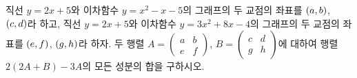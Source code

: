 직선 $y=2x+5$와 이차함수 $y=x^2-x-5$의 그래프의 두 교점의 좌표를 $(a{,}\mkern3mu\mathopen{}b)$, $(c{,}\mkern3mu\mathopen{}d)$라 하고, 직선 $y=2x+5$와 이차함수 $y=3x^2+8x-4$의 그래프의 두 교점의 좌표를 $(e{,}\mkern3mu\mathopen{}f)$, $(g{,}\mkern3mu\mathopen{}h)$라 하자. 두 행렬 $A=\begin{pmatrix} a & b \\ e & f \end{pmatrix}$, $B=\begin{pmatrix} c & d \\ g & h \end{pmatrix}$에 대하여 행렬 $2(2A+B)-3A$의 모든 성분의 합을 구하시오. 
